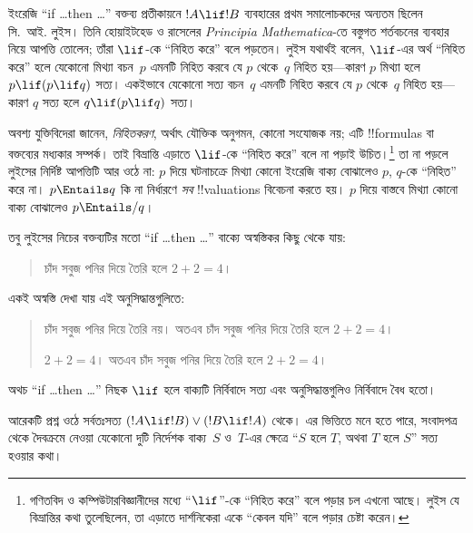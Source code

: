 \documentclass[../../../include/open-logic-section]{subfiles}
\begin{document}


ইংরেজি ``if \dots then \dots'' বক্তব্য প্রতীকায়নে
$!A \lif !B$ ব্যবহারের প্রথম সমালোচকদের অন্যতম ছিলেন
সি.~আই. লুইস। তিনি হোয়াইটহেড ও রাসেলের \emph{Principia
  Mathematica}-তে বস্তুগত শর্তবচনের ব্যবহার নিয়ে আপত্তি
তোলেন; তাঁরা $\lif$-কে ``নিহিত করে'' বলে পড়তেন। লুইস
যথার্থই বলেন, $\lif$-এর অর্থ ``নিহিত করে'' হলে যেকোনো
মিথ্যা বচন~$p$ এমনটি নিহিত করবে যে $p$ থেকে~$q$
নিহিত হয়—কারণ $p$ মিথ্যা হলে $p \lif (p \lif q)$ সত্য।
একইভাবে যেকোনো সত্য বচন~$q$ এমনটি নিহিত করবে যে $p$
থেকে~$q$ নিহিত হয়—কারণ $q$ সত্য হলে
$q \lif (p \lif q)$ সত্য।

অবশ্য যুক্তিবিদেরা জানেন, \emph{নিহিতকরণ}, অর্থাৎ যৌক্তিক
অনুগমন, কোনো সংযোজক নয়; এটি !!{formula}s বা বক্তব্যের
মধ্যকার সম্পর্ক। তাই বিভ্রান্তি এড়াতে $\lif$-কে ``নিহিত
করে'' বলে না পড়াই উচিত।\footnote{গণিতবিদ ও কম্পিউটারবিজ্ঞানীদের
  মধ্যে ``$\lif$''-কে ``নিহিত করে'' বলে পড়ার চল এখনো আছে।
  লুইস যে বিভ্রান্তির কথা তুলেছিলেন, তা এড়াতে দার্শনিকেরা
  একে ``কেবল যদি'' বলে পড়ার চেষ্টা করেন।} তা না পড়লে
লুইসের নির্দিষ্ট আপত্তিটি আর ওঠে না: $p$ দিয়ে ঘটনাচক্রে
মিথ্যা কোনো ইংরেজি বাক্য বোঝালেও $p$, $q$-কে ``নিহিত''
করে না। $p \Entails q$ কি না নির্ধারণে \emph{সব}
!!{valuation}s বিবেচনা করতে হয়। $p$ দিয়ে বাস্তবে মিথ্যা
কোনো বাক্য বোঝালেও $p \Entails/ q$।

তবু লুইসের নিচের বক্তব্যটির মতো ``if \dots then \dots''
বাক্যে অস্বস্তিকর কিছু থেকে যায়:
\begin{quote}
চাঁদ সবুজ পনির দিয়ে তৈরি হলে $2+2=4$।
\end{quote}
একই অস্বস্তি দেখা যায় এই অনুসিদ্ধান্তগুলিতে:
\begin{quote}
  চাঁদ সবুজ পনির দিয়ে তৈরি নয়। অতএব চাঁদ সবুজ পনির
  দিয়ে তৈরি হলে $2+2=4$।

  $2+2 = 4$। অতএব চাঁদ সবুজ পনির দিয়ে তৈরি হলে
  $2+2=4$।
\end{quote}
অথচ ``if \dots then \dots'' নিছক $\lif$ হলে বাক্যটি
নির্বিবাদে সত্য এবং অনুসিদ্ধান্তগুলিও নির্বিবাদে বৈধ হতো।

আরেকটি প্রশ্ন ওঠে সর্বতঃসত্য
$(!A \lif !B) \lor (!B \lif !A)$ থেকে। এর ভিত্তিতে
মনে হতে পারে, সংবাদপত্র থেকে দৈবক্রমে নেওয়া যেকোনো দুটি
নির্দেশক বাক্য~$S$ ও~$T$-এর ক্ষেত্রে ``$S$ হলে $T$,
অথবা $T$ হলে $S$'' সত্য হওয়ার কথা।
\end{document}
